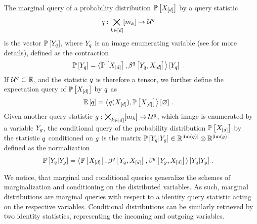 \begin{definition}
    \label{def:queries}
    The marginal query of a probability distribution $\mathbb{P}\left[X_{[d]}\right]$ by a query statistic
    \begin{align*}
        q : \bigtimes_{k\in[d]}[m_{k}] \rightarrow \mathcal{U}^{q}
    \end{align*}
    is the vector $\mathbb{P}\left[Y_{q}\right]$, where $Y_{q}$ is an image enumerating variable (see  for more details), defined as the contraction
    \begin{align*}
        \mathbb{P}\left[Y_{q}\right]
        = \left\langle \mathbb{P}\left[X_{[d]}\right],\beta^{q}\left[Y_{q},X_{[d]}\right]\right\rangle \left[ Y_{q} \right] \, .
    \end{align*}
    If $\mathcal{U}^{q}\subset\mathbb{R}$, and the statistic $q$ is therefore a tensor, we further define the expectation query of $\mathbb{P}\left[X_{[d]}\right]$ by $q$ as
    \begin{align*}
        \mathbb{E}\left[q\right] = \left\langle q(X_{[d]}),\mathbb{P}\left[X_{[d]}\right]\right\rangle \left[ \varnothing \right] \, .
    \end{align*}
    Given another query statistic $g: \bigtimes_{k\in[d]}[m_{k}] \rightarrow \mathcal{U}^{g}$, which image is enumerated by a variable $Y_{g}$, the conditional query of the probability distribution $\mathbb{P}\left[X_{[d]}\right]$ by the statistic $q$ conditioned on $g$ is the matrix $\mathbb{P}\left[Y_{q}|Y_{g}\right]\in\mathbb{R}^{\left|\mathrm{im}\left(q\right)\right|}\otimes \mathbb{R}^{\left|\mathrm{im}\left(g\right)\right|}$ defined as the normalization
    \begin{align*}
        \mathbb{P}\left[Y_{q}|Y_{g}\right]
        = \left\langle 
            \mathbb{P}\left[X_{[d]}\right],\beta^{q}\left[Y_{q},X_{[d]}\right],\beta^{g}\left[Y_{g},X_{[d]}\right]
        \right\rangle \left[ 
            Y_{q} | Y_{g}
         \right] \, .
    \end{align*}
\end{definition}

We notice, that marginal and conditional queries generalize the schemes of marginalization and conditioning on the distributed variables.
As such, marginal distributions are marginal queries with respect to a identity query statistic acting on the respective variables.
Conditional distributions can be similarly retrieved by two identity statistics, representing the incoming and outgoing variables.

